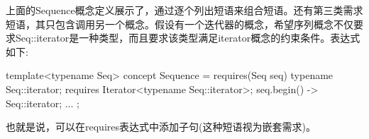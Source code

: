上面的Sequence概念定义展示了，通过逐个列出短语来组合短语。还有第三类需求短语，其只包含调用另一个概念。假设有一个迭代器的概念，希望序列概念不仅要求Seq::iterator是一种类型，而且要求该类型满足iterator概念的约束条件。表达式如下:

\begin{cpp}
template<typename Seq>
concept Sequence = requires(Seq seq) {
	typename Seq::iterator;
	requires Iterator<typename Seq::iterator>;
	{ seq.begin() } -> Seq::iterator;
	...
};
\end{cpp}

也就是说，可以在requires表达式中添加子句(这种短语视为嵌套需求)。
















